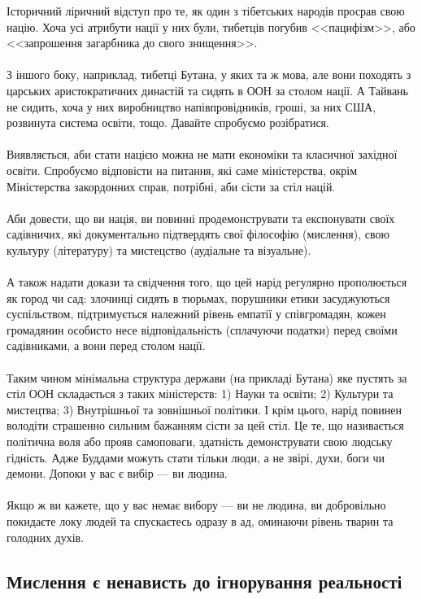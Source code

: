 Історичний ліричний відступ про те, як один з тібетських народів просрав свою націю.
Хоча усі атрибути нації у них були, тибетців погубив <<пацифізм>>,
або <<запрошення загарбника до свого знищення>>.
\\
\\
З іншого боку, наприклад, тибетці Бутана, у яких та ж мова, але вони походять
з царських аристократичних династій та сидять в ООН за столом нації. А Тайвань не сидить,
хоча у них виробництво напівпровідників, гроші, за них США, розвинута система освіти, тощо.
Давайте спробуємо розібратися.
\\
\\
Виявляється, аби стати нацією можна не мати економіки та класичної західної освіти.
Спробуємо відповісти на питання, які саме міністерства, окрім Міністерства
закордонних справ, потрібні, аби сісти за стіл націй.
\\
\\
Аби довести, що ви нація, ви повинні продемонструвати та експонувати своїх садівничих,
які документально підтвердять свої філософію (мислення), свою культуру (літературу)
та мистецство (аудіальне та візуальне).
\\
\\
А також надати докази та свідчення того, що цей нарід регулярно прополюється як город чи сад:
злочинці сидять в тюрьмах, порушники етики засуджуються суспільством, підтримується належний
рівень емпатії у співгромадян, кожен громадянин особисто несе відповідальність (сплачуючи податки)
перед своїми садівниками, а вони перед столом нації.
\\
\\
Таким чином мінімальна структура держави (на прикладі Бутана) яке пустять за стіл ООН
складається з таких міністерств: 1) Науки та освіти; 2) Культури та мистецтва; 3) Внутрішньої та зовнішньої
політики. І крім цього, нарід повинен володіти страшенно сильним бажанням сісти за цей стіл.
Це те, що називається політична воля або прояв самоповаги, здатність демонструвати свою
людську гідність. Адже Буддами можуть стати тільки люди, а не звірі, духи, боги чи демони.
Допоки у вас є вибір --- ви людина.
\\
\\
Якщо ж ви кажете, що у вас немає вибору --- ви не людина, ви добровільно покидаєте локу людей
та спускаєтесь одразу в ад, оминаючи рівень тварин та голодних духів.

\subsection{Мислення є ненависть до ігнорування реальності}

